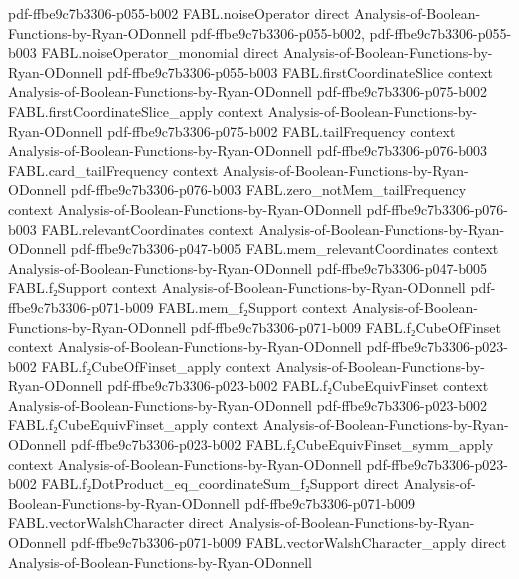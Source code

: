 \begin{theorem}
  {pdf-ffbe9c7b3306-p055-b002}
\proofstep
  {FABL.noiseOperator}
  {direct}
  {Analysis-of-Boolean-Functions-by-Ryan-ODonnell}
  {pdf-ffbe9c7b3306-p055-b002,
    pdf-ffbe9c7b3306-p055-b003}
\proofstep
  {FABL.noiseOperator_monomial}
  {direct}
  {Analysis-of-Boolean-Functions-by-Ryan-ODonnell}
  {pdf-ffbe9c7b3306-p055-b003}
\proofstep
  {FABL.firstCoordinateSlice}
  {context}
  {Analysis-of-Boolean-Functions-by-Ryan-ODonnell}
  {pdf-ffbe9c7b3306-p075-b002}
\proofstep
  {FABL.firstCoordinateSlice_apply}
  {context}
  {Analysis-of-Boolean-Functions-by-Ryan-ODonnell}
  {pdf-ffbe9c7b3306-p075-b002}
\proofstep
  {FABL.tailFrequency}
  {context}
  {Analysis-of-Boolean-Functions-by-Ryan-ODonnell}
  {pdf-ffbe9c7b3306-p076-b003}
\proofstep
  {FABL.card_tailFrequency}
  {context}
  {Analysis-of-Boolean-Functions-by-Ryan-ODonnell}
  {pdf-ffbe9c7b3306-p076-b003}
\proofstep
  {FABL.zero_notMem_tailFrequency}
  {context}
  {Analysis-of-Boolean-Functions-by-Ryan-ODonnell}
  {pdf-ffbe9c7b3306-p076-b003}
\proofstep
  {FABL.relevantCoordinates}
  {context}
  {Analysis-of-Boolean-Functions-by-Ryan-ODonnell}
  {pdf-ffbe9c7b3306-p047-b005}
\proofstep
  {FABL.mem_relevantCoordinates}
  {context}
  {Analysis-of-Boolean-Functions-by-Ryan-ODonnell}
  {pdf-ffbe9c7b3306-p047-b005}
\proofstep
  {FABL.f₂Support}
  {context}
  {Analysis-of-Boolean-Functions-by-Ryan-ODonnell}
  {pdf-ffbe9c7b3306-p071-b009}
\proofstep
  {FABL.mem_f₂Support}
  {context}
  {Analysis-of-Boolean-Functions-by-Ryan-ODonnell}
  {pdf-ffbe9c7b3306-p071-b009}
\proofstep
  {FABL.f₂CubeOfFinset}
  {context}
  {Analysis-of-Boolean-Functions-by-Ryan-ODonnell}
  {pdf-ffbe9c7b3306-p023-b002}
\proofstep
  {FABL.f₂CubeOfFinset_apply}
  {context}
  {Analysis-of-Boolean-Functions-by-Ryan-ODonnell}
  {pdf-ffbe9c7b3306-p023-b002}
\proofstep
  {FABL.f₂CubeEquivFinset}
  {context}
  {Analysis-of-Boolean-Functions-by-Ryan-ODonnell}
  {pdf-ffbe9c7b3306-p023-b002}
\proofstep
  {FABL.f₂CubeEquivFinset_apply}
  {context}
  {Analysis-of-Boolean-Functions-by-Ryan-ODonnell}
  {pdf-ffbe9c7b3306-p023-b002}
\proofstep
  {FABL.f₂CubeEquivFinset_symm_apply}
  {context}
  {Analysis-of-Boolean-Functions-by-Ryan-ODonnell}
  {pdf-ffbe9c7b3306-p023-b002}
\proofstep
  {FABL.f₂DotProduct_eq_coordinateSum_f₂Support}
  {direct}
  {Analysis-of-Boolean-Functions-by-Ryan-ODonnell}
  {pdf-ffbe9c7b3306-p071-b009}
\proofstep
  {FABL.vectorWalshCharacter}
  {direct}
  {Analysis-of-Boolean-Functions-by-Ryan-ODonnell}
  {pdf-ffbe9c7b3306-p071-b009}
\proofstep
  {FABL.vectorWalshCharacter_apply}
  {direct}
  {Analysis-of-Boolean-Functions-by-Ryan-ODonnell}

\end{theorem}
